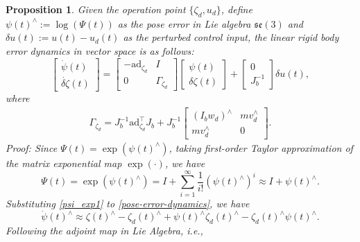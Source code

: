 \documentclass[lettersize,journal]{IEEEtran}
\newtheorem{mypro}{Proposition}
\newcommand{\ad}{\text{ad}}
\begin{document}
\begin{mypro}
Given the operation point $\{\zeta_d, {u}_d\}$,  define $\psi(t)^{\wedge} := \log(\Psi(t))$ as the pose error in Lie algebra $\mathfrak{se}(3)$ and $\delta u(t) := u(t) - u_d(t)$ as the perturbed control input, the linear rigid body error dynamics in vector space is as follows:
\begin{equation}
    \begin{bmatrix}
    \dot{\psi}(t)\\ \dot{\delta \zeta}(t)
\end{bmatrix} = \begin{bmatrix}
        -\ad_{\zeta_d} & I \\ 0 & \Gamma_{\zeta_d}
    \end{bmatrix}\begin{bmatrix}
    \psi(t)\\ \delta \zeta(t)
\end{bmatrix} + \begin{bmatrix}
    0 \\ J_b^{-1}
\end{bmatrix}\delta u(t),
 \end{equation}
 where
 \begin{equation*}
    \begin{aligned}
        \Gamma_{\zeta_d}= J_b^{-1}\ad_{\zeta_d}^{\top}J_b + J_b^{-1}\begin{bmatrix}
            (I_b w_d)^{\wedge} & m v_d^{\wedge}\\
            m v_d^{\wedge} & 0
        \end{bmatrix}.
    \end{aligned}
\end{equation*}
\textit{Proof:} Since $\Psi(t) = \exp(\psi(t)^{\wedge})$, taking first-order Taylor approximation of the matrix exponential map $\exp(\cdot)$, we have
\begin{equation}\label{psi_exp1}
    \Psi(t)  =\exp(\psi(t)^{\wedge})= I + \sum_{i=1}^{\infty}\frac{1}{i!}(\psi(t)^{\wedge})^i \approx I + \psi(t)^{\wedge}.
\end{equation}
Substituting \eqref{psi_exp1} to \eqref{pose-error-dynamics}, we have
\begin{equation}\label{linear error se3 dynamics}
    \dot{\psi}(t)^{\wedge}  \approx \zeta(t)^{\wedge} - \zeta_d(t)^{\wedge}+\psi(t)^{\wedge}\zeta_d(t)^{\wedge}-\zeta_{d}(t)^{\wedge}\psi(t)^{\wedge}.
\end{equation}
Following the adjoint map in Lie Algebra, i.e.,
\begin{equation*}

\end{equation*}
\end{mypro}
\end{document}
